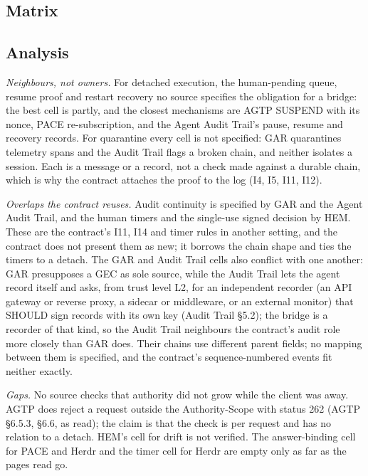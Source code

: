 \subsection{Matrix}



\subsection{Analysis}

\emph{Neighbours, not owners.} For detached execution, the human-pending
queue, resume proof and restart recovery no source specifies
the obligation for a bridge: the best cell is partly, and the closest
mechanisms are AGTP SUSPEND with its nonce, PACE re-subscription, and the
Agent Audit Trail's pause, resume and recovery records. For quarantine
every cell is not specified: GAR quarantines telemetry spans and the Audit
Trail flags a broken chain, and neither isolates a session. Each is
a message or a record, not a check made against a durable chain, which is
why the contract attaches the proof to the log (I4, I5, I11, I12).

\emph{Overlaps the contract reuses.} Audit continuity is specified by
GAR and the Agent Audit Trail, and the human timers and the single-use
signed decision by HEM. These are the contract's I11, I14 and timer rules in
another setting, and the contract does not present them as new; it borrows
the chain shape and ties the timers to a detach. The GAR and Audit Trail
cells also conflict with one another: GAR presupposes a GEC as sole source,
while the Audit Trail lets the agent record itself and asks, from trust
level L2, for an independent recorder (an API gateway or reverse proxy, a
sidecar or middleware, or an external monitor) that SHOULD sign records
with its own key (Audit Trail \S 5.2); the bridge is a recorder of that
kind, so the Audit Trail neighbours the contract's audit role more closely
than GAR does. Their chains use different parent
fields; no mapping between them is specified, and the contract's
sequence-numbered events fit neither exactly.

\emph{Gaps.} No source checks that authority did not grow
while the client was away. AGTP does reject a request outside the
Authority-Scope with status 262 (AGTP \S 6.5.3, \S 6.6, as read); the claim is that
the check is per request and has no relation to a detach. HEM's cell for
drift is not verified. The answer-binding cell for PACE and Herdr and the timer cell for
Herdr are empty only as far as the pages read go.

